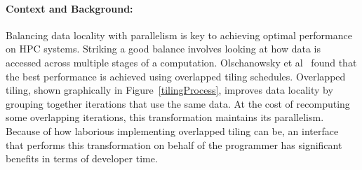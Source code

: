 \documentclass{article}
\begin{document}
\paragraph{Context and Background:}

Balancing data locality with parallelism is key to achieving optimal performance on HPC systems. 
Striking a good balance involves looking at how data is accessed across multiple stages of a computation.
Olschanowsky et al~\cite{olschanowsky2014study} found that the best performance is achieved using overlapped tiling schedules. 
Overlapped tiling, shown graphically in Figure~\ref{tilingProcess}, improves data locality by grouping together iterations that use the same data.
At the cost of recomputing some overlapping iterations, this transformation maintains its parallelism.
Because of how laborious implementing overlapped tiling can be, an interface that performs this transformation on behalf of the programmer has significant benefits in terms of developer time. 
\end{document}
